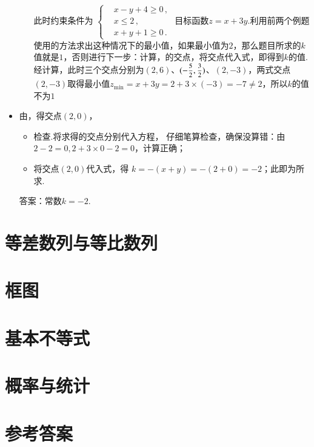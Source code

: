 \begin{exercise}
\begin{itemize}
\begin{itemize}
                  此时约束条件为
                  $\left\{\begin{aligned}
                    &x-y+4\geqslant0\,,\\
                    &x\leqslant2\,,\\
                    &x+y+1\geqslant0\,.
                  \end{aligned}\right.$
                  目标函数$z=x+3y$.利用前两个例题使用的方法求出这种情况下的最小值，如果最小值为$2$，那么题目所求的$k$值就是$1$，否则进行下一步：计算，的交点，将交点代入式，即得到$k$的值.\\
                  {\kaishu 经计算，此时三个交点分别为$(2,6)$、$(-\mfrac52,\mfrac32)$、$(2,-3)$，两式交点$(2,-3)$取得最小值$z_{\min}=x+3y=2+3\times(-3)=-7\neq2$，所以$k$的值不为$1$}
              \end{itemize}
            \item 由，得交点$(2,0)$，
              \begin{itemize}
                \item 检查.{\kaishu 将求得的交点分别代入方程，
                  仔细笔算检查，确保没算错：由$2-2=0,2+3\times0-2=0$，计算正确；}
                \item 将交点$(2,0)$代入式，得
                  $k=-(x+y)=-(2+0)=-2$；此即为所求.
              \end{itemize}
            答案：常数$k=-2$.
          \end{itemize}
  \end{exercise}
\section{等差数列与等比数列}
\section{框图}
\section{基本不等式}
\section{概率与统计}

\section{}


%
\stopexercise

\newpage
\section{参考答案}
\begin{multicols}{2}
  \printanswer
\end{multicols}
